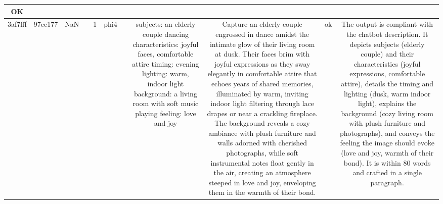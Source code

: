 \begin{table}[h!]
\begin{tabular}{|c|c|c|c|c|c|c|c|c|c|c|}
OK\\
\hline
3af7fff & 97ee177 & NaN &  & 1 & phi4 &  & subjects: an elderly couple dancing
characteristics: joyful faces, comfortable attire
timing: evening
lighting: warm, indoor light
background: a living room with soft music playing
feeling: love and joy & Capture an elderly couple engrossed in dance amidst the intimate glow of their living room at dusk. Their faces brim with joyful expressions as they sway elegantly in comfortable attire that echoes years of shared memories, illuminated by warm, inviting indoor light filtering through lace drapes or near a crackling fireplace. The background reveals a cozy ambiance with plush furniture and walls adorned with cherished photographs, while soft instrumental notes float gently in the air, creating an atmosphere steeped in love and joy, enveloping them in the warmth of their bond. & ok & The output is compliant with the chatbot description. It depicts subjects (elderly couple) and their characteristics (joyful expressions, comfortable attire), details the timing and lighting (dusk, warm indoor light), explains the background (cozy living room with plush furniture and photographs), and conveys the feeling the image should evoke (love and joy, warmth of their bond). It is within 80 words and crafted in a single paragraph.


\end{tabular}
\end{table}
